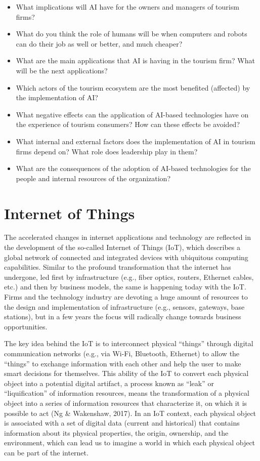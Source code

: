 \documentclass[
  letterpaper,
  DIV=11,
  numbers=noendperiod]{scrreprt}
\begin{document}
\begin{itemize}
\item
  What implications will AI have for the owners and managers of tourism
  firms?
\item
  What do you think the role of humans will be when computers and robots
  can do their job as well or better, and much cheaper?
\item
  What are the main applications that AI is having in the tourism firm?
  What will be the next applications?
\item
  Which actors of the tourism ecosystem are the most benefited
  (affected) by the implementation of AI?
\item
  What negative effects can the application of AI-based technologies
  have on the experience of tourism consumers? How can these effects be
  avoided?
\item
  What internal and external factors does the implementation of AI in
  tourism firms depend on? What role does leadership play in them?
\item
  What are the consequences of the adoption of AI-based technologies for
  the people and internal resources of the organization?
\end{itemize}

\hypertarget{internet-of-things}{%
\chapter{Internet of Things}\label{internet-of-things}}

The accelerated changes in internet applications and technology are
reflected in the development of the so-called Internet of Things (IoT),
which describes a global network of connected and integrated devices
with ubiquitous computing capabilities. Similar to the profound
transformation that the internet has undergone, led first by
infrastructure (e.g., fiber optics, routers, Ethernet cables, etc.) and
then by business models, the same is happening today with the IoT. Firms
and the technology industry are devoting a huge amount of resources to
the design and implementation of infrastructure (e.g., sensors,
gateways, base stations), but in a few years the focus will radically
change towards business opportunities.

The key idea behind the IoT is to interconnect physical ``things''
through digital communication networks (e.g., via Wi-Fi, Bluetooth,
Ethernet) to allow the ``things'' to exchange information with each
other and help the user to make smart decisions for themselves. This
ability of the IoT to convert each physical object into a potential
digital artifact, a process known as ``leak'' or ``liquification'' of
information resources, means the transformation of a physical object
into a series of information resources that characterize it, on which it
is possible to act (Ng \& Wakenshaw, 2017). In an IoT context, each
physical object is associated with a set of digital data (current and
historical) that contains information about its physical properties, the
origin, ownership, and the environment, which can lead us to imagine a
world in which each physical object can be part of the internet.
\end{document}
